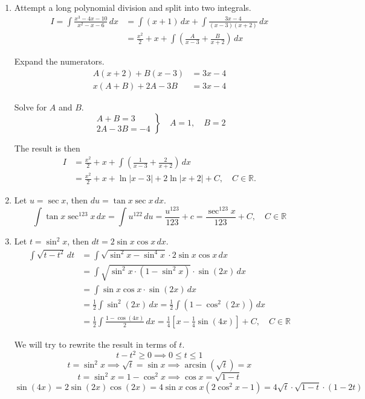 \documentclass[a4paper, 12pt]{article}
\begin{document}
\begin{enumerate}[leftmargin=*,label=\textbf{\arabic*.}]
\begin{enumerate}[leftmargin=*,label=\textbf{\alph*.}]
\item Attempt a long polynomial division and split into two integrals.
\begin{align*}
I=\int\frac{x^3-4x-10}{x^2-x-6}\,dx&=\int(x+1)\,dx+\int\frac{3x-4}{(x-3)(x+2)}\,dx\\[1em]&=\frac{x^2}2+x+\int\left({\frac{A}{x-3}+\frac{B}{x+2}}\right)\,dx
\end{align*}

Expand the numerators.
\begin{align*}
A(x+2)+B(x-3)&=3x-4\\
x(A+B)+2A-3B&=3x-4
\end{align*}

Solve for $A$ and $B$.
\[
\left.
\begin{array}{ll}
A+B=3\\
2A-3B=-4
\end{array}
\right\}
\quad A=1,\quad B=2
\]

The result is then
\begin{align*}
I &= \frac{x^2}{2}+x+\int\left(\frac{1}{x-3}+\frac{2}{x+2}\right)\,dx \\
  &= \boxed{\frac{x^2}{2}+x+\ln|x-3|+2\ln|x+2|+C,\quad C\in\mathbb{R}}.
\end{align*}

\item Let $u=\sec x$, then $du=\tan x \sec x \,dx$.
\[\int\tan x\sec^{123}x\,dx=\int u^{122}\,du=\frac{u^{123}}{123}+c = \boxed{\frac{\sec^{123}x}{123}+C,\quad C\in\mathbb{R}}\]

\item Let $t=\sin^2x$, then $dt=2\sin x\cos x\,dx$.
\begin{align*}\int\sqrt{t-t^2}\,dt&=\int\sqrt{\sin^2x-\sin^4x}\cdot2\sin x \cos x \,dx\\[1em]&=\int\sqrt{\sin^2x\cdot(1-\sin^2x)}\cdot\sin(2x)\,dx\\[1em]&=\int\sin x \cos x\cdot\sin(2x)\,dx\\[1em]&=\frac12\int\sin^2(2x)\,dx=\frac12\int\left(1-\cos^2(2x)\right)\,dx\\[1em]&=\frac12\int\frac{1-\cos(4x)}2\,dx=\frac14\left[x-\frac14\sin(4x)\right]+C,\quad C\in\mathbb{R}\end{align*}

We will try to rewrite the result in terms of $t$.
\[t-t^2 \geq 0\implies 0\leq t \leq 1\]
\[t=\sin^2x \implies\sqrt t = \sin x\implies\arcsin\left(\sqrt t\right) = x\]
\[t=\sin^2x=1-\cos^2x\implies \cos x= \sqrt{1-t}\]
\[\sin(4x)=2\sin(2x)\cos(2x)=4\sin x\cos x\left(2\cos^2x-1\right)=4\sqrt t\cdot\sqrt{1-t}\cdot(1-2t)\]


\end{enumerate}
\end{enumerate}
\end{document}
